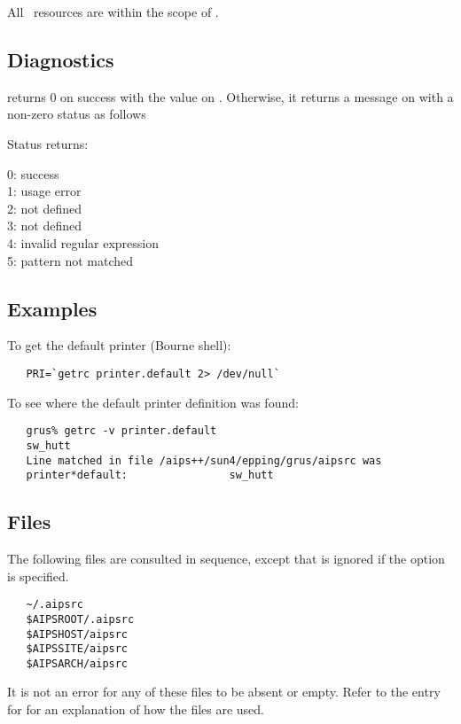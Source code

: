 All \aipspp\ resources are within the scope of .

\subsection*{Diagnostics}

 returns 0 on success with the value on .  Otherwise,
it returns a message on  with a non-zero status as follows

Status returns:
\begin{status}
   0: success\\
   1: usage error\\
   2:  not defined\\
   3:  not defined\\
   4: invalid regular expression\\
   5: pattern not matched
\end{status}

\subsection*{Examples}

To get the default printer (Bourne shell):
\begin{verbatim}
   PRI=`getrc printer.default 2> /dev/null`
\end{verbatim}

\noindent
To see where the default printer definition was found:
\begin{verbatim}
   grus% getrc -v printer.default
   sw_hutt
   Line matched in file /aips++/sun4/epping/grus/aipsrc was
   printer*default:                sw_hutt
\end{verbatim}

\subsection*{Files}

The following  files are consulted in sequence, except that
 is ignored if the  option is specified.

\begin{verbatim}
   ~/.aipsrc
   $AIPSROOT/.aipsrc
   $AIPSHOST/aipsrc
   $AIPSSITE/aipsrc
   $AIPSARCH/aipsrc
\end{verbatim}

\noindent
It is not an error for any of these files to be absent or empty.  Refer to
the entry for  for an explanation of how the 
files are used.

